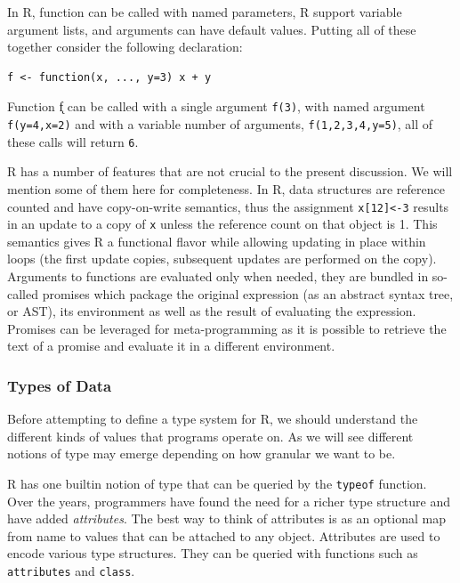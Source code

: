 \documentclass[acmsmall,review,anonymous]{acmart}\settopmatter{printfolios=true,printccs=false,printacmref=false}
\newcommand{\code}[1]{{\lstinline[style=Rin]!#1!}\xspace}
\begin{document}
In R, function can be called with named parameters, R support variable
argument lists, and arguments can have default values. Putting all of these
together consider the following declaration:

\begin{lstlisting}
f <- function(x, ..., y=3) x + y
\end{lstlisting}

\noindent
Function \k{f} can be called with a single argument \code{f(3)}, with named
argument \code{f(y=4,x=2)} and with a variable number of arguments,
\code{f(1,2,3,4,y=5)}, all of these calls will return \code{6}.

R has a number of features that are not crucial to the present
discussion. We will mention some of them here for completeness.  In R, data
structures are reference counted and have copy-on-write semantics, thus the
assignment \code{x[12]<-3} results in an update to a copy of \code{x} unless
the reference count on that object is 1.  This semantics gives R a
functional flavor while allowing updating in place within loops (the first
update copies, subsequent updates are performed on the copy). Arguments to
functions are evaluated only when needed, they are bundled in so-called
promises which package the original expression (as an abstract syntax tree, or AST), its environment
as well as the result of evaluating the expression. Promises can be
leveraged for meta-programming as it is possible to retrieve the text of a
promise and evaluate it in a different environment.


\subsubsection{Types of Data}
\label{subsubsec:backgroundtypes}

Before attempting to define a type system for R, we should understand the
different kinds of values that programs operate on.  As we will see
different notions of type may emerge depending on how granular we want to
be.

\renewcommand{\k}[1]{{\tt #1}\xspace}

R has one builtin notion of type that can be queried by the \k{typeof}
function. Over the years, programmers have found the need for a richer type
structure and have added {\it attributes}. The best way to think of attributes is
as an optional map from name to values that can be attached to any object.
Attributes are used to encode various type structures. They can be queried
with functions such as \k{attributes} and \k{class}.
\end{document}
